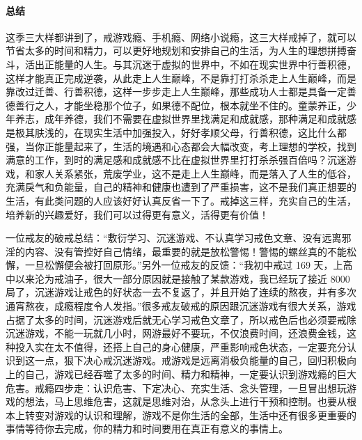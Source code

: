 \paragraph*{总结}

这季三大样都讲到了，戒游戏瘾、手机瘾、网络小说瘾，这三大样戒掉了，就可以节省太多的时间和精力，可以更好地规划和安排自己的生活，为人生的理想拼搏奋斗，活出正能量的人生。与其沉迷于虚拟的世界中，不如在现实世界中行善积德，这样才能真正完成逆袭，从此走上人生巅峰，不是靠打打杀杀走上人生巅峰，而是靠改过迁善、行善积德，这样一步步走上人生巅峰，那些成功人士都是具备一定善德善行之人，才能坐稳那个位子，如果德不配位，根本就坐不住的。童蒙养正，少年养志，成年养德，我们不需要在虚拟世界里找满足和成就感，那种满足和成就感是极其肤浅的，在现实生活中加强投入，好好孝顺父母，行善积德，这比什么都强，当你正能量起来了，生活的境遇和心态都会大幅改变，考上理想的学校，找到满意的工作，到时的满足感和成就感不比在虚拟世界里打打杀杀强百倍吗？沉迷游戏，和家人关系紧张，荒废学业，这不是走上人生巅峰，而是落入了人生的低谷，充满戾气和负能量，自己的精神和健康也遭到了严重损害，这不是我们真正想要的生活，有此类问题的人应该好好认真反省一下了。戒掉这三样，充实自己的生活，培养新的兴趣爱好，我们可以过得更有意义，活得更有价值！

一位戒友的破戒总结：“敷衍学习、沉迷游戏、不认真学习戒色文章、没有远离邪淫的内容、没有管控好自己情绪，最重要的就是放松警惕！警惕的螺丝真的不能松懈，一旦松懈便会被打回原形。”另外一位戒友的反馈：“我初中戒过 169 天，上高中以来沦为戒油子，很大一部分原因就是接触了某款游戏，我已经玩了接近 8000 局了，沉迷游戏让戒色的好状态一去不复返了，并且开始了连续的熬夜，并有多次通宵熬夜，成瘾程度令人发指。”很多戒友破戒的原因跟沉迷游戏有很大关系，游戏占据了太多的时间，沉迷游戏后就无心学习戒色文章了，所以戒色后也必须要戒除沉迷游戏，不能一玩就几小时，网游最好不要玩，不仅浪费时间，还浪费金钱，这种投入实在太不值得，还搭上自己的身心健康，严重影响戒色状态，一定要充分认识到这一点，狠下决心戒沉迷游戏。戒游戏是远离消极负能量的自己，回归积极向上的自己，游戏已经吞噬了太多的时间、精力和精神，一定要认识到游戏瘾的巨大危害。戒瘾四步走：认识危害、下定决心、充实生活、念头管理，一旦冒出想玩游戏的想法，马上思维危害，这就是思维对治，从念头上进行干预和控制。也要从根本上转变对游戏的认识和理解，游戏不是你生活的全部，生活中还有很多更重要的事情等待你去完成，你的精力和时间要用在真正有意义的事情上。

